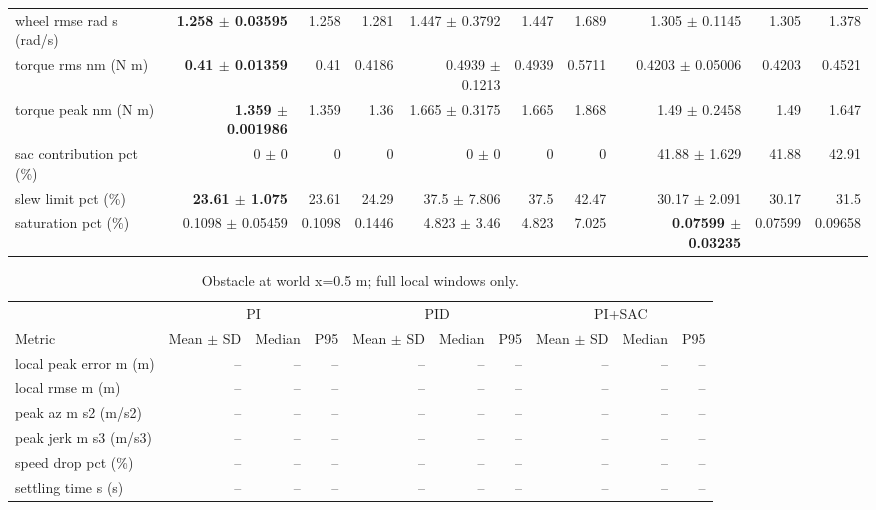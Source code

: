 \begin{table}[t]
\begin{tabular}{p{}*{9}{r}}
wheel rmse rad s (rad/s) & \textbf{1.258 $\pm$ 0.03595} & 1.258 & 1.281 & 1.447 $\pm$ 0.3792 & 1.447 & 1.689 & 1.305 $\pm$ 0.1145 & 1.305 & 1.378 \\
torque rms nm (N m) & \textbf{0.41 $\pm$ 0.01359} & 0.41 & 0.4186 & 0.4939 $\pm$ 0.1213 & 0.4939 & 0.5711 & 0.4203 $\pm$ 0.05006 & 0.4203 & 0.4521 \\
torque peak nm (N m) & \textbf{1.359 $\pm$ 0.001986} & 1.359 & 1.36 & 1.665 $\pm$ 0.3175 & 1.665 & 1.868 & 1.49 $\pm$ 0.2458 & 1.49 & 1.647 \\
sac contribution pct (\%) & 0 $\pm$ 0 & 0 & 0 & 0 $\pm$ 0 & 0 & 0 & 41.88 $\pm$ 1.629 & 41.88 & 42.91 \\
slew limit pct (\%) & \textbf{23.61 $\pm$ 1.075} & 23.61 & 24.29 & 37.5 $\pm$ 7.806 & 37.5 & 42.47 & 30.17 $\pm$ 2.091 & 30.17 & 31.5 \\
saturation pct (\%) & 0.1098 $\pm$ 0.05459 & 0.1098 & 0.1446 & 4.823 $\pm$ 3.46 & 4.823 & 7.025 & \textbf{0.07599 $\pm$ 0.03235} & 0.07599 & 0.09658 \\
\bottomrule
\end{tabular}
\end{table}
\begin{table}[t]
\centering
\scriptsize
\caption{Obstacle at world x=0.5 m; full local windows only.}
\label{tab:obstacle-1}
\begin{tabular}{p{}*{9}{r}}
\toprule
 & \multicolumn{3}{c}{PI} & \multicolumn{3}{c}{PID} & \multicolumn{3}{c}{PI+SAC} \\
\cmidrule(lr){2-4}\cmidrule(lr){5-7}\cmidrule(lr){8-10}
Metric & Mean $\pm$ SD & Median & P95 & Mean $\pm$ SD & Median & P95 & Mean $\pm$ SD & Median & P95 \\
\midrule
local peak error m (m) & -- & -- & -- & -- & -- & -- & -- & -- & -- \\
local rmse m (m) & -- & -- & -- & -- & -- & -- & -- & -- & -- \\
peak az m s2 (m/s2) & -- & -- & -- & -- & -- & -- & -- & -- & -- \\
peak jerk m s3 (m/s3) & -- & -- & -- & -- & -- & -- & -- & -- & -- \\
speed drop pct (\%) & -- & -- & -- & -- & -- & -- & -- & -- & -- \\
settling time s (s) & -- & -- & -- & -- & -- & -- & -- & -- & -- \\
\bottomrule
\end{tabular}
\end{table}
